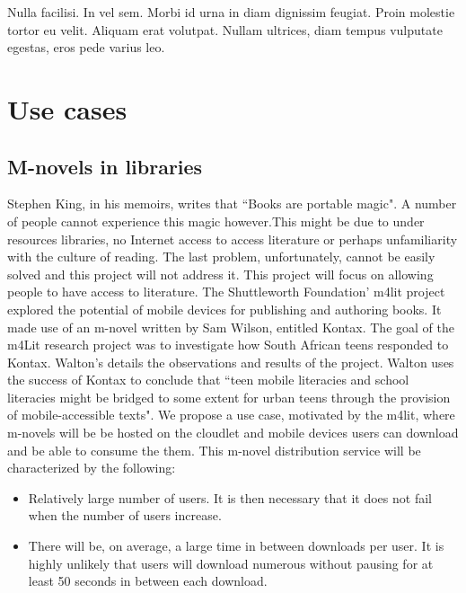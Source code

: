 \newcommand{\RNum}[1]{\uppercase\expandafter{\romannumeral #1\relax}}

\begin{savequote}[75mm] 
Nulla facilisi. In vel sem. Morbi id urna in diam dignissim feugiat. Proin molestie tortor eu velit. Aliquam erat volutpat. Nullam ultrices, diam tempus vulputate egestas, eros pede varius leo.
\end{savequote}

\chapter{Use cases}
\label{chapterthree}

\section{M-novels in libraries}
Stephen King, in his memoirs, writes that ``Books are portable magic"\cite[p. 96]{king2000writing}. A number of people cannot experience this magic however.This might be due to under resources libraries, no Internet access to access literature or perhaps unfamiliarity with the culture of reading. The last problem, unfortunately, cannot be easily solved and this project will not address it. This project will focus on allowing people to have access to literature. The Shuttleworth Foundation' m4lit project explored the potential of
mobile devices for publishing and authoring books. It made use of an m-novel
written by Sam Wilson, entitled Kontax. The goal of the m4Lit research project
was to investigate how South African teens responded to Kontax. Walton's\cite{walton2010mobile} details the observations and results of the project. Walton\cite{walton2010mobile} uses the success of Kontax to conclude that ``teen mobile literacies and school literacies might be bridged to some extent for urban teens through the provision of mobile-accessible texts"\cite[p. \RNum{7}]{walton2010mobile}. We propose a use case, motivated by the m4lit, where m-novels will be be hosted on the cloudlet and mobile devices users can download and be able to consume the them. This m-novel distribution service will be characterized by the following:

\begin{itemize}
\item Relatively large number of users. It is then necessary that it does not fail when the number of users increase.

\item There will be, on average, a large time in between downloads per user. It is highly unlikely that users will download numerous without pausing for at least 50 seconds in between each download.
\end{itemize}

